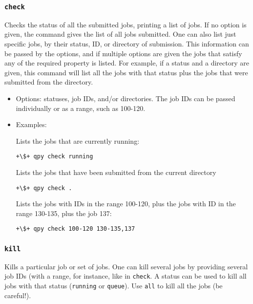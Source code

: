 \documentclass[a4paper,12pt]{article}
\begin{document}
  
\subsubsection{\texttt{check}}

Checks the status of all the submitted jobs, printing a list of jobs.
If no option is given, the command gives the list of all jobs submitted.
One can also list just specific jobs, by their status, ID, or directory of submission.
This information can be passed by the options, and if multiple options are given the jobs that satisfy any of the required property is listed.
For example, if a status and a directory are given, this command will list all the jobs with that status plus the jobs that were submitted from the directory.

\begin{itemize}
  
\item Options:
  statuses, job IDs, and/or directories.
  The job IDs can be passed individually or as a range, such as 100-120.
  
\item Examples:

  Lists the jobs that are currently running:

  \begin{lstlisting}[style=BashStyle]
+\$+ qpy check running
  \end{lstlisting}

  Lists the jobs that have been submitted from the current directory

  \begin{lstlisting}[style=BashStyle]
+\$+ qpy check .
  \end{lstlisting}

  Lists the jobs with IDs in the range 100-120, plus the jobs with ID in the range 130-135, plus the job 137:

  \begin{lstlisting}[style=BashStyle]
+\$+ qpy check 100-120 130-135,137
  \end{lstlisting}
\end{itemize}

\subsubsection{\texttt{kill}}

Kills a particular job or set of jobs.
One can kill several jobs by providing several job IDs (with a range, for instance, like in \texttt{check}.
A status can be used to kill all jobs with that status (\texttt{running} or \texttt{queue}).
Use \texttt{all} to kill all the jobs (be careful!).
\end{document}
